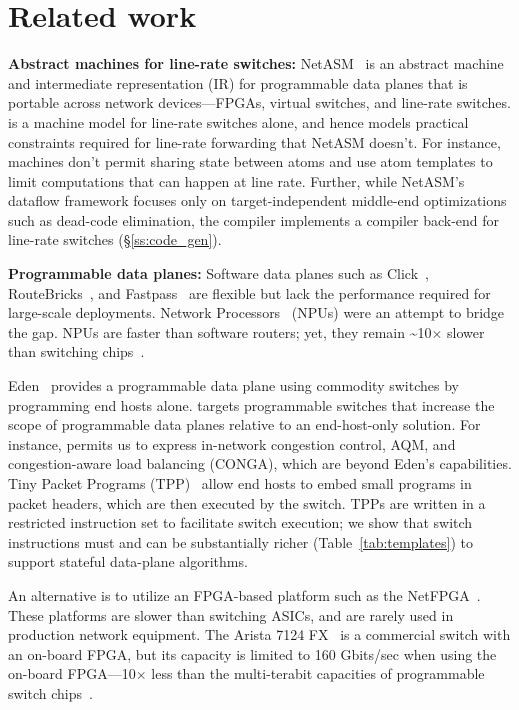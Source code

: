 \section{Related work}
\label{s:related}
\textbf{Abstract machines for line-rate switches:}
NetASM~\cite{netasm} is an abstract machine and intermediate representation
(IR) for programmable data planes that is portable across network
devices---FPGAs, virtual switches, and line-rate switches.  \absmachine is a
machine model for line-rate switches alone, and hence models practical
constraints required for line-rate forwarding that NetASM doesn't. For
instance, \absmachine machines don't permit sharing state between atoms and use
atom templates to limit computations that can happen at line rate. Further,
while NetASM's dataflow framework focuses only on target-independent middle-end
optimizations such as dead-code elimination, the \pktlanguage compiler
implements a compiler back-end for line-rate switches
(\S\ref{ss:code_gen}).

\textbf{Programmable data planes:}
Software data planes such as Click~\cite{click},
RouteBricks~\cite{routebricks}, and Fastpass~\cite{fastpass} are flexible but
lack the performance required for large-scale deployments. Network
Processors~\cite{ixp4xx} (NPUs) were an attempt to bridge the gap.  NPUs are
faster than software routers; yet, they remain \textasciitilde10$\times$ slower
than switching chips~\cite{rmt}.

Eden~\cite{eden} provides a programmable data plane using commodity switches by
programming end hosts alone. \pktlanguage targets programmable switches that
increase the scope of programmable data planes relative to an end-host-only
solution. For instance, \pktlanguage permits us to express in-network
congestion control, AQM, and congestion-aware load balancing (CONGA), which are
beyond Eden's capabilities. Tiny Packet Programs (TPP)~\cite{tpp} allow end
hosts to embed small programs in packet headers, which are then executed by the
switch. TPPs are written in a restricted instruction set to facilitate switch
execution; we show that switch instructions must and can be substantially
richer (Table~\ref{tab:templates}) to support stateful data-plane algorithms.

An alternative is to utilize an FPGA-based platform such as the NetFPGA~\cite{netfpga}.
These platforms are
slower than switching ASICs, and are rarely used in production network
equipment. The Arista 7124 FX~\cite{7124fx} is a commercial switch with an
on-board FPGA, but its capacity is limited to 160 Gbits/sec when using the
on-board FPGA---10$\times$ less than the multi-terabit capacities of programmable
switch chips~\cite{xpliant, tofino}.

